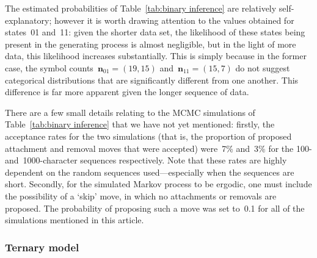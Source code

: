 \documentclass[11pt,a4paper]{article}
\newcommand\ub[1]{\symbf{#1}}                 %
\begin{document}
The estimated probabilities of Table~\ref{tab:binary inference} are relatively
self-explanatory; however it is worth drawing attention to the values obtained
for states~01 and~11: given the shorter data set, the likelihood of these states
being present in the generating process is almost negligible, but in the light
of more data, this likelihood increases substantially. This is simply because in
the former case, the symbol counts~\(\ub{n}_{01} = (19, 15)\) and~\(\ub{n}_{11}
= (15, 7)\) do not suggest categorical distributions that are significantly
different from one another. This difference is far more apparent given the
longer sequence of data.

There are a few small details relating to the MCMC simulations of
Table~\ref{tab:binary inference} that we have not yet mentioned: firstly, the
acceptance rates for the two simulations (that is, the proportion of proposed
attachment and removal moves that were accepted) were~7\% and~3\% for the 100-
and~1000-character sequences respectively. Note that these rates are highly
dependent on the random sequences used---especially when the sequences are
short. Secondly, for the simulated Markov process to be ergodic, one must
include the possibility of a `skip' move, in which no attachments or removals
are proposed. The probability of proposing such a move was set to~0.1 for all of
the simulations mentioned in this article.

\subsubsection{Ternary model} %
\end{document}
